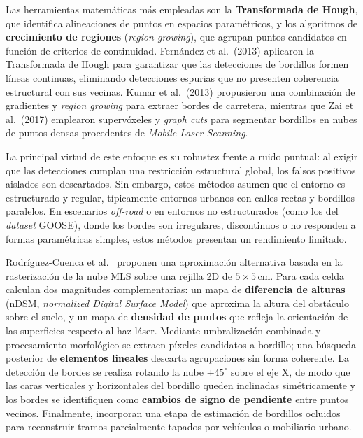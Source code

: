Las herramientas matemáticas más empleadas son la \textbf{Transformada
de Hough}, que identifica alineaciones de puntos en espacios
paramétricos, y los algoritmos de \textbf{crecimiento de regiones}
(\textit{region growing}), que agrupan puntos candidatos en función de
criterios de continuidad. Fernández et al.\ (2013) aplicaron la
Transformada de Hough para garantizar que las detecciones de bordillos
formen líneas continuas, eliminando detecciones espurias que no
presenten coherencia estructural con sus vecinas. Kumar et al.\ (2013)
propusieron una combinación de gradientes y \textit{region growing}
para extraer bordes de carretera, mientras que Zai et al.\ (2017)
emplearon supervóxeles y \textit{graph cuts} para segmentar bordillos
en nubes de puntos densas procedentes de \textit{Mobile Laser Scanning}.

La principal virtud de este enfoque es su robustez frente a ruido
puntual: al exigir que las detecciones cumplan una restricción
estructural global, los falsos positivos aislados son descartados. Sin
embargo, estos métodos asumen que el entorno es estructurado y regular,
típicamente entornos urbanos con calles rectas y bordillos paralelos.
En escenarios \textit{off-road} o en entornos no estructurados (como
los del \textit{dataset} GOOSE), donde los bordes son irregulares,
discontinuos o no responden a formas paramétricas simples, estos
métodos presentan un rendimiento limitado.

Rodríguez-Cuenca et al.~\cite{ericson2005collision} proponen una
aproximación alternativa basada en la rasterización de la nube MLS
sobre una rejilla 2D de $5 \times 5$\,cm. Para cada celda calculan dos
magnitudes complementarias: un mapa de \textbf{diferencia de alturas}
(nDSM, \textit{normalized Digital Surface Model}) que aproxima la
altura del obstáculo sobre el suelo, y un mapa de \textbf{densidad de
puntos} que refleja la orientación de las superficies respecto al haz
láser. Mediante umbralización combinada y procesamiento morfológico se
extraen píxeles candidatos a bordillo; una búsqueda posterior de
\textbf{elementos lineales} descarta agrupaciones sin forma coherente.
La detección de bordes se realiza rotando la nube $\pm 45^{\circ}$
sobre el eje X, de modo que las caras verticales y horizontales del
bordillo queden inclinadas simétricamente y los bordes se identifiquen
como \textbf{cambios de signo de pendiente} entre puntos vecinos.
Finalmente, incorporan una etapa de estimación de bordillos ocluidos
para reconstruir tramos parcialmente tapados por vehículos o mobiliario
urbano.

